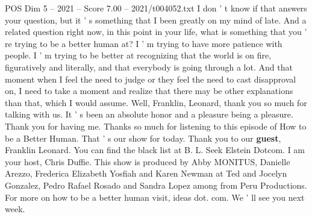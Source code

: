 \begin{textsample}{POS Dim 5 – 2021 – Score 7.00 – 2021/t004052.txt}
I don ' t know if that answers your question, but it ' s something that I been greatly on my mind of late.
And a related question right now, in this point in your life, what is something that you ' re trying to be a better human at?
I ' m trying to have more patience with people.
I ' m trying to be better at recognizing that the world is on fire, figuratively and literally, and that everybody is going through a lot.
And that moment when I feel the need to judge or they feel the need to cast disapproval on, I need to take a moment and realize that there may be other explanations than that, which I would assume.
Well, Franklin, Leonard, thank you so much for talking with us.
It ' s been an absolute honor and a pleasure being a pleasure.
Thank you for having me.
Thanks so much for listening to this episode of How to be a Better Human.
That ' s our show for today.
Thank you to our \textbf{guest}, Franklin Leonard.
You can find the black list at B.
L.
Seek Elstein Dotcom.
I am your host, Chris Duffie.
This show is produced by Abby MONITUS, Danielle Arezzo, Frederica Elizabeth Yosfiah and Karen Newman at Ted and Jocelyn Gonzalez, Pedro Rafael Rosado and Sandra Lopez among from Peru Productions.
For more on how to be a better human visit, ideas dot. com.
We ' ll see you next week.

\end{textsample}
